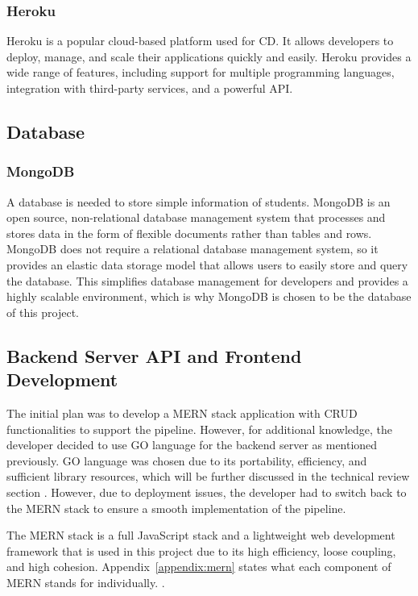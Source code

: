 \subsubsection{Heroku}
Heroku is a popular cloud-based platform used for CD. It allows developers to deploy, manage, and scale their applications quickly and easily. Heroku provides a wide range of features, including support for multiple programming languages, integration with third-party services, and a powerful API.

\subsection{Database}
\subsubsection{MongoDB}
A database is needed to store simple information of students. MongoDB is an open source, non-relational database management system that processes and stores data in the form of flexible documents rather than tables and rows. MongoDB does not require a relational database management system, so it provides an elastic data storage model that allows users to easily store and query the database. This simplifies database management for developers and provides a highly scalable environment, which is why MongoDB is chosen to be the database of this project.

\subsection{Backend Server API and Frontend Development}
The initial plan was to develop a MERN stack application with CRUD functionalities to support the pipeline. However, for additional knowledge, the developer decided to use GO language for the backend server as mentioned previously. GO language was chosen due to its portability, efficiency, and sufficient library resources, which will be further discussed in the technical review section \cite{mihalis, andrew, cgptt}. However, due to deployment issues, the developer had to switch back to the MERN stack to ensure a smooth implementation of the pipeline.

The MERN stack is a full JavaScript stack and a lightweight web development framework that is used in this project due to its high efficiency, loose coupling, and high cohesion. Appendix~\ref{appendix:mern} states what each component of MERN stands for individually. \cite{eddy, shama}.

